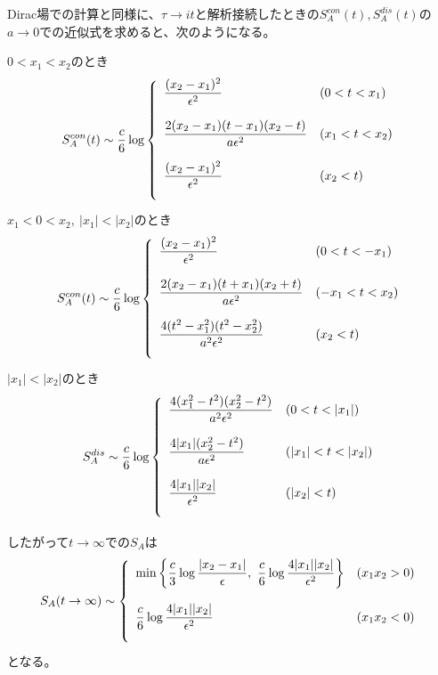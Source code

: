 Dirac場での計算と同様に、$\tau\to it$と解析接続したときの$S^{con}_A(t),S^{dis}_A(t)$の$a\to 0$での近似式を求めると、次のようになる。

$0<x_1<x_2$のとき
\begin{align}
S_{A}^{con}(t)\sim \frac{c}{6}\log\left\{
\begin{array}{ll}
\bigskip
\dfrac{(x_2-x_1)^2}{\epsilon^2}& (0<t<x_1)\\
\bigskip
\dfrac{2(x_2-x_1)(t-x_1)(x_2-t)}{a\epsilon^2}& (x_1<t<x_2)\\
\bigskip
\dfrac{(x_2-x_1)^2}{\epsilon^2}& (x_2<t)
\end{array}
\right.
\end{align}
$x_1<0<x_2,\ |x_1|<|x_2|$のとき
\begin{align}
S_{A}^{con}(t) \sim \frac{c}{6}\log\left\{
\begin{array}{ll}
\bigskip
\dfrac{(x_2-x_1)^2}{\epsilon^2}& (0<t<-x_1)\\
\bigskip
\dfrac{2(x_2-x_1)(t+x_1)(x_2+t)}{a\epsilon^2}& (-x_1<t<x_2)\\
\bigskip
\dfrac{4(t^2-x_1^2)(t^2-x_2^2)}{a^2\epsilon^2}& (x_2<t)\\
\end{array}
\right.
\end{align}
$|x_1|<|x_2|$のとき
\begin{equation}
S_{A}^{dis} \sim \frac{c}{6}\log\left\{
\begin{array}{ll}
\bigskip
\dfrac{4(x_1^2-t^2)(x_2^2-t^2)}{a^2\epsilon^2}& (0<t<|x_1|)\\
\bigskip
\dfrac{4|x_1|(x_2^2-t^2)}{a\epsilon^2}& (|x_1|<t<|x_2|) \\
\bigskip
\dfrac{4|x_1||x_2|}{\epsilon^2}& (|x_2|<t)
\end{array}
\right.
\end{equation}

したがって$t\to\infty$での$S_A$は
\begin{align}
S_A(t\to\infty)\sim \left\{ \begin{array}{ll}
\bigskip
\min\left\{ \dfrac{c}{3}\log\dfrac{|x_2-x_1|}{\epsilon},\  \dfrac{c}{6}\log\dfrac{4|x_1||x_2|}{\epsilon^2} \right\} & (x_1x_2>0) \\
\bigskip
\dfrac{c}{6}\log\dfrac{4|x_1||x_2|}{\epsilon^2} & (x_1x_2<0) 
\end{array}\right.
\end{align}
となる。

